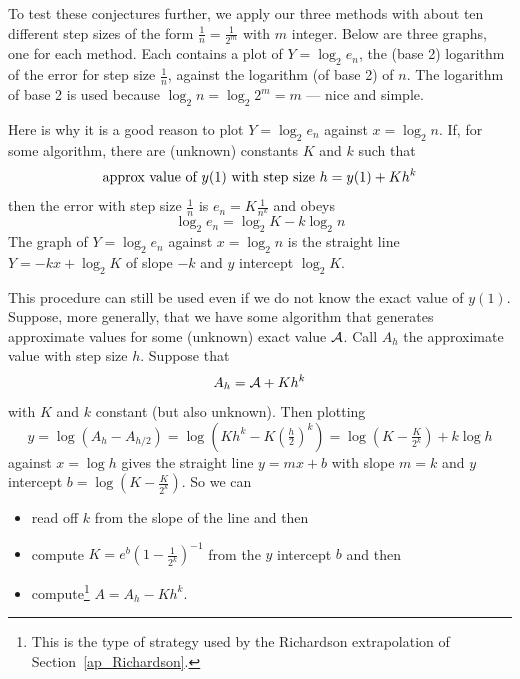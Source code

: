 To test these conjectures further, we apply our three methods with
about ten different step sizes of the form $\frac{1}{n}=\frac{1}{2^m}$ 
with $m$ integer. 
Below are three graphs, one for each method. Each contains a plot
of $Y=\log_2 e_n$, the (base 2) logarithm  of the error for step size $\frac{1}{n}$, against the logarithm (of base 2) of $n$. 
The logarithm of base 2 is used because $\log_2n=\log_2 2^m=m$ --- nice and simple. 

Here is why it is a good reason to plot $Y=\log_2 e_n$ against $x=\log_2 n$. 
 If, for some algorithm, there are (unknown) constants $K$ and $k$ such that
\begin{equation*}
\hbox{approx value of $y(1)$ with step size } h= y(1)+K h^k
\end{equation*}
then the error with step size $\frac{1}{n}$ is $e_n=K\frac{1}{n^k}$
and obeys
\begin{equation}
\log_2 e_n =\log_2 K -k \log_2 n
\tag{E1}\end{equation} 
The graph of $Y=\log_2 e_n$  against $x=\log_2 n$ is the straight line
$Y=-kx+\log_2K$ of slope $-k$ and $y$ intercept $\log_2K$.

\begin{remark}\label{rmk:findk}
This procedure can still be used even if we do not know the exact value
of $y(1)$. Suppose, more generally, that we have some algorithm that generates
approximate values for some (unknown) exact value $\mathcal{A}$. Call $A_h$ the 
approximate value with step size $h$. Suppose that
\begin{equation*}
A_h=\mathcal{A}+Kh^k
\end{equation*}
with $K$ and $k$ constant (but also unknown). Then plotting
\begin{equation*}
y=\log(A_h-A_{h/2})=\log\left(Kh^k-K\left(\tfrac{h}{2}\right)^k\right)
=\log\left(K-\tfrac{K}{2^k}\right)+k\log h
\end{equation*}
against $x=\log h$ gives the straight line $y=mx+b$ with slope $m=k$ and $y$ intercept $b=\log\left(K-\tfrac{K}{2^k}\right)$. So we can
\begin{itemize}\itemsep1pt \parskip0pt  %
\item
read off $k$ from the slope of the line and then
\item
compute $K=e^b\left(1-\frac{1}{2^k}\right)^{-1}$ from the $y$ intercept $b$
and then
\item
compute\footnote{This is the type of strategy used by the Richardson extrapolation of Section~\ref{ap_Richardson}.} $A=A_h-Kh^k$.
\end{itemize}
\end{remark}


